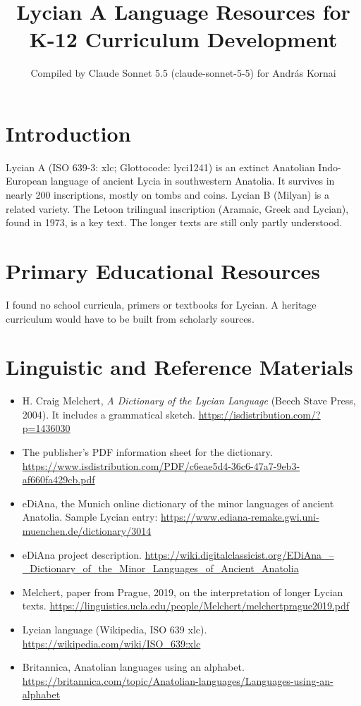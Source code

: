 \documentclass[12pt]{article}
\title{Lycian A Language Resources for K-12 Curriculum Development}
\author{Compiled by Claude Sonnet 5.5 (claude-sonnet-5-5) for Andr\'as Kornai}
\date{}
\begin{document}
\maketitle

\section{Introduction}
Lycian A (ISO 639-3: xlc; Glottocode: lyci1241) is an extinct Anatolian Indo-European language of ancient Lycia in southwestern Anatolia. It survives in nearly 200 inscriptions, mostly on tombs and coins. Lycian B (Milyan) is a related variety. The Letoon trilingual inscription (Aramaic, Greek and Lycian), found in 1973, is a key text. The longer texts are still only partly understood.

\section{Primary Educational Resources}
I found no school curricula, primers or textbooks for Lycian. A heritage curriculum would have to be built from scholarly sources.

\section{Linguistic and Reference Materials}
\begin{itemize}
\item H. Craig Melchert, \emph{A Dictionary of the Lycian Language} (Beech Stave Press, 2004). It includes a grammatical sketch. \url{https://isdistribution.com/?p=1436030}
\item The publisher's PDF information sheet for the dictionary. \url{https://www.isdistribution.com/PDF/c6eae5d4-36c6-47a7-9eb3-af660fa429cb.pdf}
\item eDiAna, the Munich online dictionary of the minor languages of ancient Anatolia. Sample Lycian entry: \url{https://www.ediana-remake.gwi.uni-muenchen.de/dictionary/3014}
\item eDiAna project description. \url{https://wiki.digitalclassicist.org/EDiAna_–_Dictionary_of_the_Minor_Languages_of_Ancient_Anatolia}
\item Melchert, paper from Prague, 2019, on the interpretation of longer Lycian texts. \url{https://linguistics.ucla.edu/people/Melchert/melchertprague2019.pdf}
\item Lycian language (Wikipedia, ISO 639 xlc). \url{https://wikipedia.com/wiki/ISO_639:xlc}
\item Britannica, Anatolian languages using an alphabet. \url{https://britannica.com/topic/Anatolian-languages/Languages-using-an-alphabet}
\end{itemize}
\end{document}
